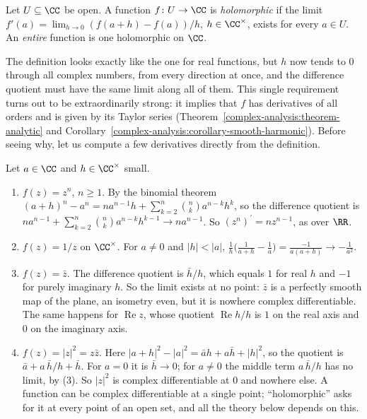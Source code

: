 \begin{definition}\label{complex-analysis:definition-holomorphic}
Let $U \subseteq \CC$ be open. A function $f \colon U \to \CC$ is \emph{holomorphic} if the limit $f'(a) = \lim_{h \to 0}(f(a + h) - f(a))/h$, $h \in \CC^\times$, exists for every $a \in U$. An
\emph{entire} function is one holomorphic on $\CC$.
\end{definition}

The definition looks exactly like the one for real functions, but $h$ now tends to $0$ through all complex numbers, from every direction at once, and the difference quotient must have the same limit
along all of them. This single requirement turns out to be extraordinarily strong: it implies that $f$ has derivatives of all orders and is given by its Taylor series
(Theorem~\ref{complex-analysis:theorem-analytic} and Corollary~\ref{complex-analysis:corollary-smooth-harmonic}). Before seeing why, let us compute a few derivatives directly from the definition.

\begin{example}\label{complex-analysis:example-derivative-definition}
Let $a \in \CC$ and $h \in \CC^\times$ small.
\begin{enumerate}
\item $f(z) = z^n$, $n \geq 1$. By the binomial theorem $(a + h)^n - a^n = na^{n-1}h + \sum_{k = 2}^n\binom nka^{n-k}h^k$, so the difference quotient is
$na^{n-1} + \sum_{k = 2}^n\binom nka^{n-k}h^{k-1} \to na^{n-1}$. So $(z^n)^{\prime} = nz^{n-1}$, as over $\RR$.
\item $f(z) = 1/z$ on $\CC^\times$. For $a \neq 0$ and $|h| < |a|$, $\frac1h\bigl(\frac1{a + h} - \frac1a\bigr) = \frac{-1}{a(a + h)} \to -\frac1{a^2}$.
\item $f(z) = \bar z$. The difference quotient is $\bar h/h$, which equals $1$ for real $h$ and $-1$ for purely imaginary $h$. So the limit exists at no point: $\bar z$ is a perfectly smooth map of the
plane, an isometry even, but it is nowhere complex differentiable. The same happens for $\operatorname{Re}z$, whose quotient $\operatorname{Re}h/h$ is $1$ on the real axis and $0$ on the imaginary
axis.
\item $f(z) = |z|^2 = z\bar z$. Here $|a + h|^2 - |a|^2 = \bar ah + a\bar h + |h|^2$, so the quotient is $\bar a + a\,\bar h/h + \bar h$. For $a = 0$ it is $\bar h \to 0$; for $a \neq 0$ the middle term
$a\,\bar h/h$ has no limit, by (3). So $|z|^2$ is complex differentiable at $0$ and nowhere else. A function can be complex differentiable at a single point; ``holomorphic'' asks for it at every point
of an open set, and all the theory below depends on this.
\end{enumerate}
\end{example}


